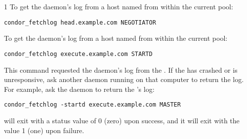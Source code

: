 \begin{ManPage}{\label{man-condor-fetchlog}}{1}
\Examples
To get the  daemon's log from a host named 
 from within the current pool:
\begin{verbatim}
condor_fetchlog head.example.com NEGOTIATOR
\end{verbatim}

To get the  daemon's log from a host named
 from within the current pool:
\begin{verbatim}
condor_fetchlog execute.example.com STARTD
\end{verbatim}

This command requested the  daemon's log from the
.
If the  has crashed or is unresponsive,
ask another daemon
running on that computer to return the log.
For example, ask the  daemon to return the
's log:

\begin{verbatim}
condor_fetchlog -startd execute.example.com MASTER
\end{verbatim}

\ExitStatus
{} will exit with a status value of 0 (zero) upon success,
and it will exit with the value 1 (one) upon failure.

\end{ManPage}
